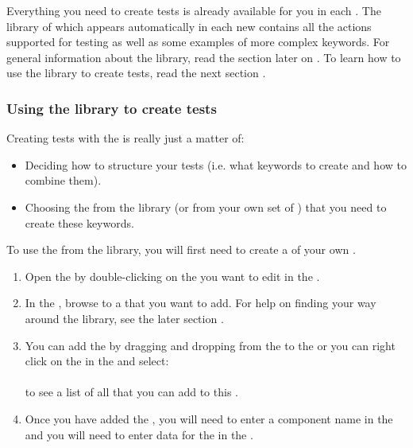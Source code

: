 
Everything you need to create tests is already available for you in each \gdproject{}. The library of \gdcases{} which appears automatically in each new \gdproject{} contains all the actions supported for testing as well as some examples of more complex keywords. For general information about the library, read the section later on . To learn how to use the library to create tests, read the next section . 


\subsubsection{Using the library to create tests}
\label{UseLibrary}
Creating tests with the \ite{} is really just a matter of:
\begin{itemize}
\item Deciding how to structure your tests (i.e. what keywords to create and how to combine them).
\item Choosing the \gdcases{} from the library (or from your own set of \gdcases{}) that you need to create these keywords. 
\end{itemize}

To use the \gdcases{} from the library, you will first need to create a \gdcase{} of your own . 

\begin{enumerate}
\item Open the \gdtestcaseeditor{} by double-clicking on the \gdcase{} you want to edit in the \gdtestcasebrowser{}. 
\item In the \gdtestcasebrowser{}, browse to a \gdcase{} that you want to add. For help on finding your way around the library, see the later section . 
\item You can add the \gdcase{} by dragging and dropping from the \gdtestcasebrowser{} to the \gdtestcaseeditor{} or you can right click on the \gdcase{} in the \gdtestcaseeditor{} and select:\\
\\
to see a list of all \gdcases{} that you can add to this \gdcase{}. 



\item Once you have added the \gdcase{}, you will need to enter a component name in the \gdcompnamesview{}  and you will need to enter data for the \gdcase{} in the \gdpropview{} . 
\end{enumerate}


